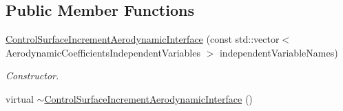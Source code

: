 \subsection*{Public Member Functions}
\begin{DoxyCompactItemize}
\item 
\hyperlink{classtudat_1_1aerodynamics_1_1ControlSurfaceIncrementAerodynamicInterface_a6e394a5420a42d40ba7f7fd39d97dfbe}{Control\+Surface\+Increment\+Aerodynamic\+Interface} (const std\+::vector$<$ Aerodynamic\+Coefficients\+Independent\+Variables $>$ independent\+Variable\+Names)
\begin{DoxyCompactList}\small\item\em Constructor. \end{DoxyCompactList}\item 
virtual \hyperlink{classtudat_1_1aerodynamics_1_1ControlSurfaceIncrementAerodynamicInterface_a36dca5cbb78f5bc4069ed99292bf90a1}{$\sim$\+Control\+Surface\+Increment\+Aerodynamic\+Interface} ()\hypertarget{classtudat_1_1aerodynamics_1_1ControlSurfaceIncrementAerodynamicInterface_a36dca5cbb78f5bc4069ed99292bf90a1}{}\label{classtudat_1_1aerodynamics_1_1ControlSurfaceIncrementAerodynamicInterface_a36dca5cbb78f5bc4069ed99292bf90a1}


\end{DoxyCompactItemize}
